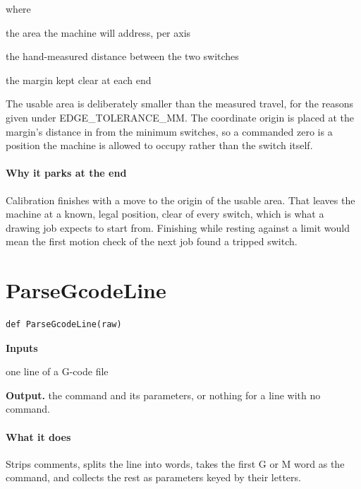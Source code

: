 \noindent where
\begin{description}[leftmargin=2.4em,style=nextline,font=\normalfont\ttfamily]\setlength\itemsep{1pt}
  \item[{$\mathrm{usable}$}] \normalfont the area the machine will address, per axis
  \item[{$\mathrm{switchTravel}$}] \normalfont the hand-measured distance between the two switches
  \item[{$\mathrm{edgeTolerance}$}] \normalfont the margin kept clear at each end
\end{description}
The usable area is deliberately smaller than the measured travel, for the reasons given under EDGE\_TOLERANCE\_MM. The coordinate origin is placed at the margin's distance in from the minimum switches, so a commanded zero is a position the machine is allowed to occupy rather than the switch itself.


\paragraph{Why it parks at the end}
Calibration finishes with a move to the origin of the usable area. That leaves the machine at a known, legal position, clear of every switch, which is what a drawing job expects to start from. Finishing while resting against a limit would mean the first motion check of the next job found a tripped switch.


\section{ParseGcodeLine}
\begin{lstlisting}[style=sig]
def ParseGcodeLine(raw)
\end{lstlisting}

\noindent\textbf{Inputs}
\begin{description}[leftmargin=2.2em,style=nextline,font=\normalfont\ttfamily]\setlength\itemsep{1pt}
  \item[{raw}] \normalfont one line of a G-code file
\end{description}

\noindent\textbf{Output.} the command and its parameters, or nothing for a line with no command.


\paragraph{What it does}
Strips comments, splits the line into words, takes the first G or M word as the command, and collects the rest as parameters keyed by their letters.


